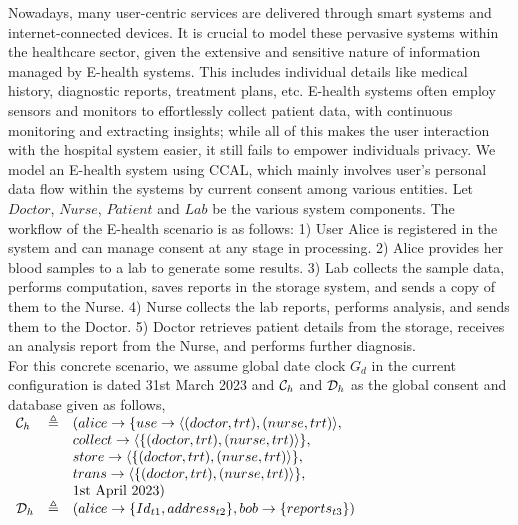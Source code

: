 Nowadays, many user-centric services are delivered through smart systems and internet-connected devices. It is crucial to model these pervasive systems within the healthcare sector, given the extensive and sensitive nature of information managed by E-health systems. This includes individual details like medical history, diagnostic reports, treatment plans, etc. E-health systems often employ sensors and monitors to effortlessly collect patient data, with continuous monitoring and extracting insights; while all of this makes the user interaction with the hospital system easier, it still fails to empower individuals privacy.
We model an E-health system using CCAL, which mainly involves user's personal data flow within the systems by current consent among various entities.  Let %
$ \textit{Doctor}$, $ \textit{Nurse}$, $ \textit{Patient}$ and $ \textit{Lab}$ be the various system components. 
The workflow of the E-health scenario is as follows: 
    1) User Alice is registered in the system and can manage consent at any stage in processing.
    2) Alice provides her blood samples to a lab to generate some results.
    3) Lab collects the sample data, performs computation, saves reports in the storage system, and sends a copy of them to the Nurse.
    4) Nurse collects the lab reports, performs analysis, and sends them to the Doctor.
    5) Doctor retrieves patient details from the storage, receives an analysis report from the Nurse, and performs further diagnosis.\\
For this concrete scenario, we assume global date clock $ G_d$ in the current configuration is dated 31st March 2023 and $ \mathcal{C}_h $ and $ \mathcal{D}_h$ as the global consent and database given as follows, \\
%
$\begin{array}{lcl}
 \textstyle  \mathcal{C}_h &  \triangleq & (alice \rightarrow  \{   use \rightarrow \langle (doctor, trt) , (nurse, trt)\rangle  ,\\
 & &  collect \rightarrow \langle\{ (doctor, trt) , (nurse, trt)\rangle \} , \\
 & & store \rightarrow \langle\{ (doctor, trt) , (nurse, trt)\rangle \}  , \\ 
 & & trans \rightarrow \langle\{ (doctor, trt) , (nurse, trt)\rangle \} ,  \\
 & & \text{1st April 2023} )  \\
 \mathcal{D}_{h} &  \triangleq & (alice \rightarrow  \{ Id_{t1}, address_{t2}\} , bob \rightarrow \{ reports_{t3} \})  
\end{array}$
